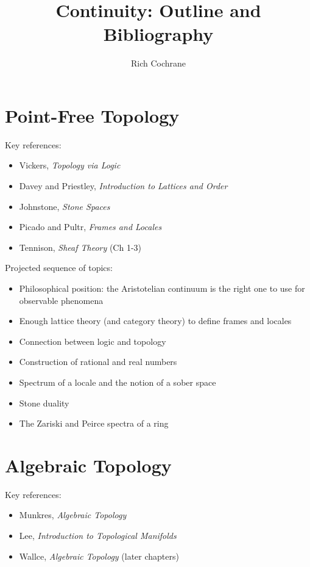 \documentclass[article]{article}
\begin{document}
\title{Continuity: Outline and Bibliography}
\author{Rich Cochrane}
\maketitle

\section{Point-Free Topology}

Key references:
\begin{itemize}
	\item{Vickers, \emph{Topology via Logic}}
	\item{Davey and Priestley, \textit{Introduction to Lattices and Order}}
	\item{Johnstone, \emph{Stone Spaces}}
	\item{Picado and Pultr, \emph{Frames and Locales}}
	\item{Tennison, \emph{Sheaf Theory} (Ch 1-3)}
\end{itemize}


Projected sequence of topics:
\begin{itemize}
	\item{Philosophical position: the Aristotelian continuum is the right one to use for observable phenomena}
	\item{Enough lattice theory (and category theory) to define frames and locales}
	\item{Connection between logic and topology}
	\item{Construction of rational and real numbers}
	\item{Spectrum of a locale and the notion of a sober space}
	\item{Stone duality}
	\item{The Zariski and Peirce spectra of a ring}
\end{itemize}


\section{Algebraic Topology}

Key references:
\begin{itemize}
	\item{Munkres, \textit{Algebraic Topology}}
	\item{Lee, \textit{Introduction to Topological Manifolds}}
	\item{Wallce, \textit{Algebraic Topology} (later chapters)}
\end{itemize}
\end{document}
